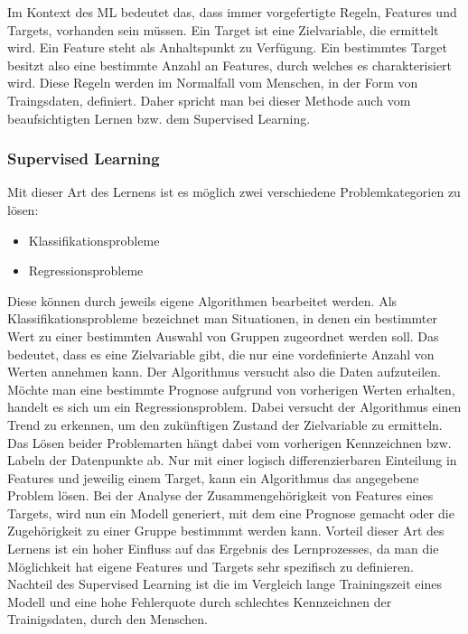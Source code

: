 \documentclass[12pt,german,ngerman]{report}
\begin{document}
        Im Kontext des ML bedeutet das, dass immer vorgefertigte Regeln, Features und Targets, vorhanden sein müssen.
        Ein Target ist eine Zielvariable, die ermittelt wird. 
        Ein Feature steht als Anhaltspunkt zu Verfügung.
        Ein bestimmtes Target
        besitzt also eine bestimmte Anzahl an Features, durch welches es charakterisiert wird.
        Diese Regeln werden im Normalfall vom Menschen, in der Form von Traingsdaten, definiert. Daher spricht man bei dieser Methode
        auch vom beaufsichtigten Lernen bzw. dem Supervised Learning.

        \subsubsection{Supervised Learning}
            Mit dieser Art des Lernens ist es möglich zwei verschiedene 
            Problemkategorien zu lösen\cite{supervisedlearning2021ibm}:

            \begin{itemize}
                \item{Klassifikationsprobleme}
                \item{Regressionsprobleme}
            \end{itemize}

            Diese können durch jeweils eigene Algorithmen bearbeitet werden.
            Als Klassifikationsprobleme bezeichnet man Situationen, in denen ein bestimmter Wert zu einer
            bestimmten Auswahl von Gruppen zugeordnet werden soll. Das bedeutet, dass es eine Zielvariable gibt, die
            nur eine vordefinierte Anzahl von Werten annehmen kann.\cite{kibuisness2021supervised}
            Der Algorithmus versucht also die Daten aufzuteilen.
            Möchte man eine bestimmte Prognose aufgrund von vorherigen Werten erhalten,
            handelt es sich um ein Regressionsproblem.\cite{kibuisness2021supervised}
            Dabei versucht der Algorithmus einen Trend zu erkennen, um den zukünftigen Zustand der Zielvariable zu ermitteln. 
            Das Lösen beider Problemarten hängt dabei vom vorherigen Kennzeichnen bzw. Labeln der Datenpunkte ab.
            Nur mit einer logisch differenzierbaren Einteilung in Features und jeweilig einem Target, 
            kann ein Algorithmus das angegebene Problem lösen.
            Bei der Analyse der Zusammengehörigkeit von Features eines Targets, wird nun ein Modell
            generiert, mit dem eine Prognose gemacht oder die Zugehörigkeit zu einer Gruppe bestimmmt werden kann.
            Vorteil dieser Art des Lernens ist ein hoher Einfluss auf das Ergebnis des Lernprozesses,
            da man die Möglichkeit hat eigene Features und Targets sehr spezifisch zu definieren.
            Nachteil des Supervised Learning ist die im Vergleich lange Trainingszeit eines Modell
            und eine hohe Fehlerquote durch schlechtes Kennzeichnen der Trainigsdaten, durch den Menschen.
            
\end{document}

